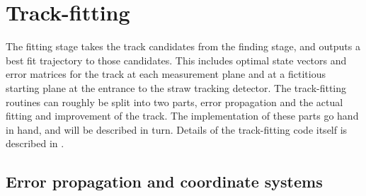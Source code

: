 







\section{Track-fitting}
\label{sec:TrackFitting}


The fitting stage takes the track candidates from the finding stage, and outputs a best fit trajectory to those candidates. This includes optimal state vectors and error matrices for the track at each measurement plane and at a fictitious starting plane at the entrance to the straw tracking detector. The track-fitting routines can roughly be split into two parts, error propagation and the actual fitting and improvement of the track. The implementation of these parts go hand in hand, and will be described in turn. Details of the track-fitting code itself is described in . 


\subsection{Error propagation and coordinate systems}
\label{sub:Geane}

